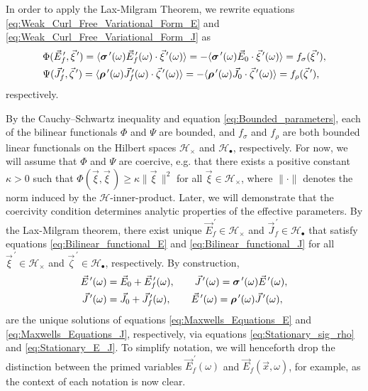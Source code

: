 \documentclass[11pt]{amsart}
\newcommand\bsig{\mbox{\boldmath${\sigma}$}}
\newcommand\brho{\mbox{\boldmath${\rho}$}}
\begin{document}
%
In order to apply the Lax-Milgram Theorem, we
rewrite equations \eqref{eq:Weak_Curl_Free_Variational_Form_E} and
\eqref{eq:Weak_Curl_Free_Variational_Form_J} as
%
\begin{align}
  \label{eq:Bilinear_functional_E}
   &\Phi(\vec{E}_f^{\,\prime},\vec{\xi}^{\,\prime})
     =\langle\bsig^{\,\prime}(\omega)\vec{E}_f^{\,\prime}(\omega)\cdot\vec{\xi}^{\,\prime}(\omega)\rangle
     =-\langle\bsig^{\,\prime}(\omega)\vec{E}_0\cdot\vec{\xi}^{\,\prime}(\omega)\rangle
     =f_\sigma(\vec{\xi}^{\,\prime}),
  \\
  \label{eq:Bilinear_functional_J}
  &\Psi(\vec{J}_f^{\,\prime},\vec{\zeta}^{\,\prime})
     =\langle\brho^{\,\prime}(\omega)\vec{J}_f^{\,\prime}(\omega)\cdot\vec{\zeta}^{\,\prime}(\omega)\rangle
     =-\langle\brho^{\,\prime}(\omega)\vec{J}_0\cdot\vec{\zeta}^{\,\prime}(\omega)\rangle
     =f_\rho(\vec{\zeta}^{\,\prime}),
\end{align}
%
respectively.




By the Cauchy--Schwartz inequality and equation
\eqref{eq:Bounded_parameters}, each of the bilinear functionals $\Phi$
and $\Psi$ are bounded, and $f_\sigma$ and $f_\rho$ are both bounded linear
functionals on the Hilbert spaces $\mathscr{H}_\times$ and 
$\mathscr{H}_\bullet$, respectively. For now, we will assume that $\Phi$ and
$\Psi$ are coercive, e.g. that there exists a positive constant 
$\kappa>0$ such that $\Phi(\vec{\xi},\vec{\xi}\,)\geq\kappa\|\vec{\xi}\,\|^2$ for all 
$\vec{\xi}\in\mathscr{H}_\times$, where $\|\cdot\|$ denotes the norm induced by the
$\mathscr{H}$-inner-product. Later, we will demonstrate that the
coercivity condition determines analytic properties of the
effective parameters. By the Lax-Milgram theorem, there exist unique
$\vec{E}_f^{\,\prime}\in\mathscr{H}_\times$ and $\vec{J}_f^{\,\prime}\in\mathscr{H}_\bullet$
that satisfy equations \eqref{eq:Bilinear_functional_E} and
\eqref{eq:Bilinear_functional_J} for all $\vec{\xi}^{\,\prime}\in\mathscr{H}_\times$
and $\vec{\zeta}^{\,\prime}\in\mathscr{H}_\bullet$, respectively. By construction,
%
\begin{align}\label{eq:Unique_Solutions}
  \vec{E}^{\,\prime}(\omega)&=\vec{E}_0+\vec{E}_f^{\,\prime}(\omega), \qquad
  \vec{J}^{\,\prime}(\omega)=\bsig^{\,\prime}(\omega)\vec{E}^{\,\prime}(\omega),
  \\
  \vec{J}^{\,\prime}(\omega)&=\vec{J}_0+\vec{J}_f^{\,\prime}(\omega), \qquad
  \vec{E}^{\,\prime}(\omega)=\brho^{\,\prime}(\omega)\vec{J}^{\,\prime}(\omega),
\end{align}
%
are the unique solutions of equations \eqref{eq:Maxwells_Equations_E}
and \eqref{eq:Maxwells_Equations_J}, respectively, via equations
\eqref{eq:Stationary_sig_rho} and \eqref{eq:Stationary_E_J}. 
To simplify notation, we will henceforth drop
the distinction between the primed variables $\vec{E}_f^{\,\prime}(\omega)$ and 
$\vec{E}_f(\vec{x},\omega)$, for example, as the context of each notation
is now clear.
\end{document}
